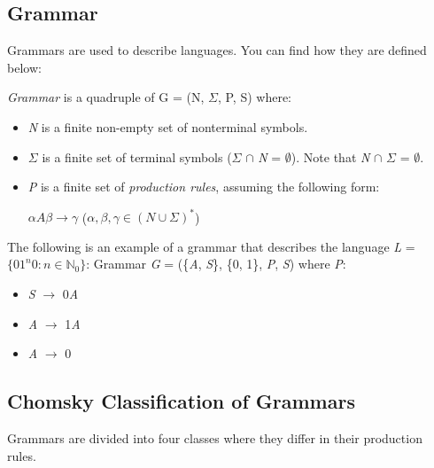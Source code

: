 \subsection{Grammar}

Grammars are used to describe languages. You can find how they are defined below:

\begin{definition}
    \textit{Grammar} is a quadruple of G = (N, $\Sigma$, P, S) where:
\end{definition}
\begin{itemize}
    \item \textit{N} is a finite non-empty set of nonterminal symbols.
    \item $\Sigma$ is a finite set of terminal symbols ($\Sigma$ $\cap$ \textit{N} = $\emptyset$). Note that \textit{N} $\cap$ $\Sigma$ = $\emptyset$.
    \item \textit{P} is a finite set of \textit{production rules}, assuming the following form:\\

    \centerline{$\alpha\textit{A}\beta \rightarrow \gamma$ ($\alpha, \beta, \gamma \in (\textit{N} \cup \Sigma)^*$)}
\end{itemize}

The following is an example of a grammar that describes the language \textit{L} = $\{01^\textit{n}0 : \textit{n} \in \mathbb{N}_0\}$:
Grammar \textit{G} = (\{\textit{A}, \textit{S}\}, \{0, 1\}, \textit{P}, \textit{S}) where \textit{P}:
\begin{itemize}
    \item \textit{S} $\rightarrow$ 0\textit{A}
    \item \textit{A} $\rightarrow$ 1\textit{A}
    \item \textit{A} $\rightarrow$ 0
\end{itemize}

\subsection{Chomsky Classification of Grammars}

Grammars are divided into four classes where they differ in their production rules. 

